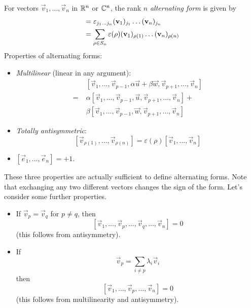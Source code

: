 \documentclass{../template/note}
\begin{document}
    \begin{definition}
        For vectors \(\vec v_1, \dots, \vec v_n\) in \(\mathbb R^n\) or \(\mathbb C^n\), the rank \(n\) \emph{alternating form} is given by
        \begin{align*}
            [\vec v_1, \dots, \vec v_n] &= \lv{j_1\dots j_n}(\vec v_1)_{j_1}\dots (\vec v_n)_{j_n} \\
            &= \sum_{\rho \in S_n} \varepsilon(\rho) (\vec v_1)_{\rho(1)}\dots (\vec v_n)_{\rho(n)}
        \end{align*}
        Properties of alternating forms:
        \begin{itemize}
            \item \emph{Multilinear} (linear in any argument):
            \begin{align*}
                &\;[\vec v_1, \dots, \vec v_{p-1}, \alpha \vec u + \beta \vec w, \vec v_{p+1}, \dots, \vec v_n] \\
                =&\;\alpha[\vec v_1, \dots, \vec v_{p-1}, \vec u, \vec v_{p+1}, \dots, \vec v_n] + \\
                &\;\beta[\vec v_1, \dots, \vec v_{p-1}, \vec w, \vec v_{p+1}, \dots, \vec v_n]
            \end{align*}
            \item \emph{Totally antisymmetric}:
            \[
                [\vec v_{\rho(1)},\dots, \vec v_{\rho(n)}] = \varepsilon(\rho) [\vec v_1, \dots, \vec v_n]
            \]
            \item \([\vec e_1, \dots, \vec e_n] = +1\).
        \end{itemize}
    \end{definition}
    
    These three properties are actually sufficient to define alternating forms. Note that exchanging any two different vectors changes the sign of the form. Let's consider some further properties.

    \begin{itemize}
        \item If \(\vec v_p = \vec v_q\) for \(p \neq q\), then
        \[
            [\vec v_1, \dots, \vec v_p, \dots, \vec v_q, \dots, \vec v_n] = 0
        \]
        (this follows from antisymmetry).
        \item If
        \[
            \vec v_p = \sum_{i \neq p} \lambda_i \vec v_i
        \]
        then
        \[
            [\vec v_1, \dots, \vec v_p, \dots, \vec v_n] = 0
        \]
        (this follows from multilinearity and antisymmetry).
    \end{itemize}
    
\end{document}

